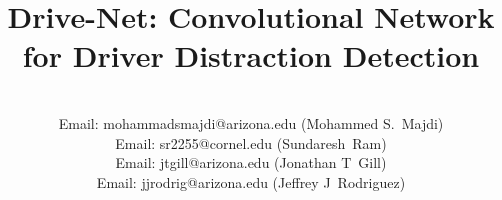 \documentclass[conference,compsoc]{IEEEtran}
\begin{document}
\nocite{*}


%


\title{Drive-Net: Convolutional Network for Driver Distraction Detection}
      
\author{
    \\Email: mohammadsmajdi@arizona.edu ({Mohammed S.~Majdi})\\Email: sr2255@cornel.edu ({Sundaresh~Ram})\\Email: jtgill@arizona.edu ({Jonathan T~Gill})\\Email: jjrodrig@arizona.edu ({Jeffrey J~Rodriguez})}


\maketitle 
\end{document}

